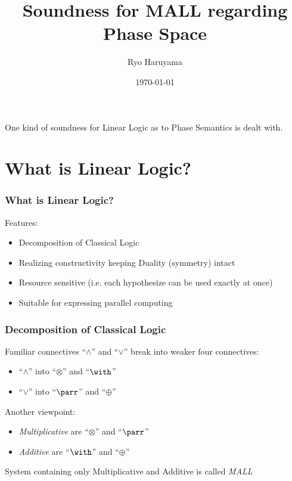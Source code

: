 \documentclass[dvipdfmx,cjk]{beamer}
\theoremstyle{example}
\begin{document}
\title[LL]{Soundness for MALL regarding Phase Space} 
\author[Haruyama]{Ryo Haruyama}
\date{\today}

\begin{frame}
  \titlepage
\end{frame}

\begin{frame}
  One kind of soundness for Linear Logic as to Phase Semantics is dealt with.
  \tableofcontents
\end{frame}

                          \section{What is Linear Logic?}
                          
\begin{frame}
  \frametitle{What is Linear Logic?}
  Features:

  \begin{itemize}
    \item Decomposition of Classical Logic 
    \item Realizing constructivity keeping Duality (symmetry) intact 
    \item Resource sensitive (i.e. each hypothesize can be used exactly at once) 
    \item Suitable for expressing parallel computing
  \end{itemize}
  
\end{frame}

\begin{frame}
  \frametitle{Decomposition of Classical Logic} 

    Familiar connectives ``$\wedge$'' and ``$\vee$'' break into weaker four connectives:

    \begin{itemize}
      \item ``$\wedge$'' into ``$\otimes$'' and ``$\with$'' 
      \item ``$\vee$''   into ``$\parr$''   and ``$\oplus$'' 
    \end{itemize}

    Another viewpoint:

    \begin{itemize}
      \item \textit{Multiplicative} are ``$\otimes$'' and ``$\parr$'' 
      \item \textit{Additive} are ``$\with$''   and ``$\oplus$'' 
    \end{itemize}

    System containing only Multiplicative and Additive is called \textit{MALL}
    
\end{frame}
\end{document}
